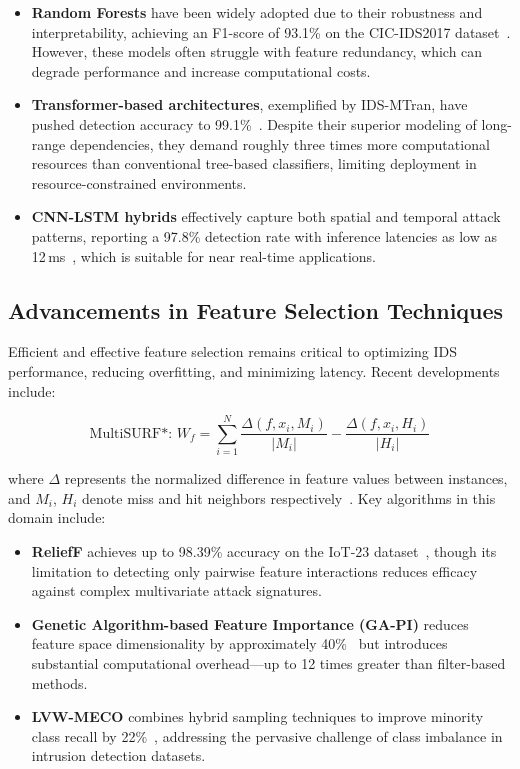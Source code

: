 \documentclass[conference]{IEEEtran}
\begin{document}
\begin{itemize}
\item \textbf{Random Forests} have been widely adopted due to their robustness and interpretability, achieving an F1-score of 93.1\% on the CIC-IDS2017 dataset~\cite{rf2023}. However, these models often struggle with feature redundancy, which can degrade performance and increase computational costs.
\item \textbf{Transformer-based architectures}, exemplified by IDS-MTran, have pushed detection accuracy to 99.1\%~\cite{zhang}. Despite their superior modeling of long-range dependencies, they demand roughly three times more computational resources than conventional tree-based classifiers, limiting deployment in resource-constrained environments.
\item \textbf{CNN-LSTM hybrids} effectively capture both spatial and temporal attack patterns, reporting a 97.8\% detection rate with inference latencies as low as 12\,ms~\cite{cnn2023}, which is suitable for near real-time applications.
\end{itemize}

\subsection{Advancements in Feature Selection Techniques}
Efficient and effective feature selection remains critical to optimizing IDS performance, reducing overfitting, and minimizing latency. Recent developments include:

\begin{equation}
\text{MultiSURF*: } W_f = \sum_{i=1}^N \frac{\Delta(f,x_i,M_i)}{|M_i|} - \frac{\Delta(f,x_i,H_i)}{|H_i|}
\end{equation}

where $\Delta$ represents the normalized difference in feature values between instances, and $M_i$, $H_i$ denote miss and hit neighbors respectively~\cite{urbanowicz}. Key algorithms in this domain include:

\begin{itemize}
\item \textbf{ReliefF} achieves up to 98.39\% accuracy on the IoT-23 dataset~\cite{iot2023}, though its limitation to detecting only pairwise feature interactions reduces efficacy against complex multivariate attack signatures.
\item \textbf{Genetic Algorithm-based Feature Importance (GA-PI)} reduces feature space dimensionality by approximately 40\%~\cite{ga2024} but introduces substantial computational overhead—up to 12 times greater than filter-based methods.
\item \textbf{LVW-MECO} combines hybrid sampling techniques to improve minority class recall by 22\%~\cite{lvw2023}, addressing the pervasive challenge of class imbalance in intrusion detection datasets.
\end{itemize}
\end{document}

